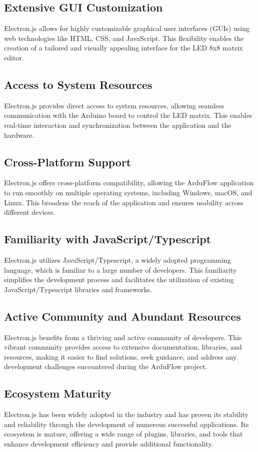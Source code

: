 \documentclass[a4paper, 11pt]{article}
\begin{document}
\subsection{Extensive GUI Customization}
Electron.js allows for highly customizable graphical user interfaces (GUIs) using web technologies like HTML, CSS, and JavaScript. This flexibility enables the creation of a tailored and visually appealing interface for the LED 8x8 matrix editor.
\subsection{Access to System Resources}
Electron.js provides direct access to system resources, allowing seamless communication with the Arduino board to control the LED matrix. This enables real-time interaction and synchronization between the application and the hardware.
\subsection{Cross-Platform Support}
Electron.js offers cross-platform compatibility, allowing the ArduFlow application to run smoothly on multiple operating systems, including Windows, macOS, and Linux. This broadens the reach of the application and ensures usability across different devices.

\subsection{Familiarity with JavaScript/Typescript}
Electron.js utilizes JavaScript/Typescript, a widely adopted programming language, which is familiar to a large number of developers. This familiarity simplifies the development process and facilitates the utilization of existing JavaScript/Typescript libraries and frameworks.

\subsection{Active Community and Abundant Resources}
Electron.js benefits from a thriving and active community of developers. This vibrant community provides access to extensive documentation, libraries, and resources, making it easier to find solutions, seek guidance, and address any development challenges encountered during the ArduFlow project.

\subsection{Ecosystem Maturity}
Electron.js has been widely adopted in the industry and has proven its stability and reliability through the development of numerous successful applications. Its ecosystem is mature, offering a wide range of plugins, libraries, and tools that enhance development efficiency and provide additional functionality.

\pagebreak
\end{document}
